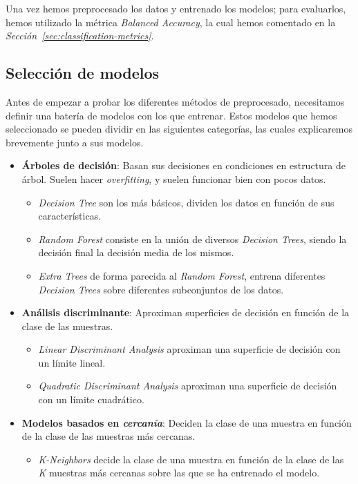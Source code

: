 Una vez hemos preprocesado los datos y entrenado los modelos; para evaluarlos, hemos utilizado la métrica \textit{Balanced Accuracy}, la cual hemos comentado en la \textit{Sección\ \ref{sec:classification-metrics}}.

\subsection{Selección de modelos}

Antes de empezar a probar los diferentes métodos de preprocesado, necesitamos definir una batería de modelos con los que entrenar. Estos modelos que hemos seleccionado se pueden dividir en las siguientes categorías, las cuales explicaremos brevemente junto a sus modelos.

\begin{itemize}
    \item \textbf{Árboles de decisión}: Basan sus decisiones en condiciones en estructura de árbol. Suelen hacer \textit{overfitting}, y suelen funcionar bien con pocos datos.
    \begin{itemize}
        \item \textit{Decision Tree} son los más básicos, dividen los datos en función de sus características.
        \item \textit{Random Forest} consiste en la unión de diversos \textit{Decision Trees}, siendo la decisión final la decisión media de los mismos.
        \item \textit{Extra Trees} de forma parecida al \textit{Random Forest}, entrena diferentes \textit{Decision Trees} sobre diferentes subconjuntos de los datos.
    \end{itemize}
         \item \textbf{Análisis discriminante}: Aproximan superficies de decisión en función de la clase de las muestras.
        \begin{itemize}
            \item \textit{Linear Discriminant Analysis} aproximan una superficie de decisión con un límite lineal.
            \item \textit{Quadratic Discriminant Analysis} aproximan una superficie de decisión con un límite cuadrático.
        \end{itemize}
    \item \textbf{Modelos basados en \textit{cercanía}}: Deciden la clase de una muestra en función de la clase de las muestras más cercanas.
        \begin{itemize}
            \item \textit{K-Neighbors} decide la clase de una muestra en función de la clase de las \textit{K} muestras más cercanas sobre las que se ha entrenado el modelo.

\end{itemize}
\end{itemize}
